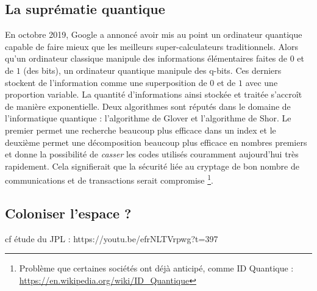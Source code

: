 \documentclass[a4paper,11pt]{book}
\begin{document}
\subsection{La suprématie quantique}
En octobre 2019, Google a annoncé avoir mis au point un ordinateur quantique capable de faire mieux que les meilleurs super-calculateurs \guillemotleft traditionnels\guillemotright. Alors qu'un ordinateur classique manipule des informations élémentaires faites de $0$ et de $1$ (des bits), un ordinateur quantique manipule des q-bits. Ces derniers stockent de l'information comme une superposition de $0$ et de $1$ avec une proportion variable. La quantité d'informations ainsi stockée et traitée s'accroît de manière exponentielle. Deux algorithmes sont réputés dans le domaine de l'informatique quantique : l'algorithme de Glover et l'algorithme de Shor. Le premier permet une recherche beaucoup plus efficace dans un index et le deuxième permet une décomposition beaucoup plus efficace en nombres premiers et donne la possibilité de \textit{casser} les codes utilisés couramment aujourd'hui très rapidement. Cela signifierait que la sécurité liée au cryptage de bon nombre de communications et de transactions serait compromise \footnote{Problème que certaines sociétés ont déjà anticipé, comme ID Quantique : \url{https://en.wikipedia.org/wiki/ID_Quantique}}.

\subsection{Coloniser l'espace ?}
cf étude du JPL :
https://youtu.be/efrNLTVrpwg?t=397
\end{document}
